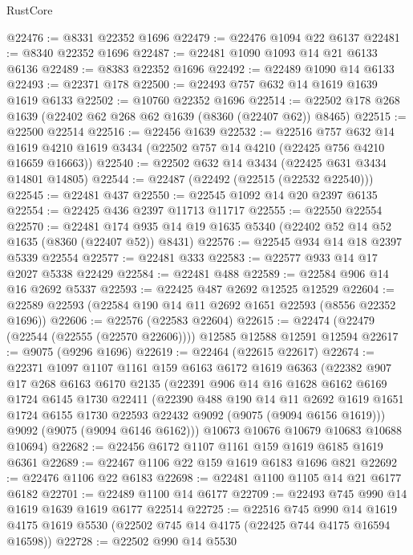 \begin{lexlean}{RustCore}
\begin{coremodule}
@22476 := @8331 @22352 @1696
@22479 := @22476 @1094 @22 @6137
@22481 := @8340 @22352 @1696
@22487 := @22481 @1090 @1093 @14 @21 @6133 @6136
@22489 := @8383 @22352 @1696
@22492 := @22489 @1090 @14 @6133
@22493 := @22371 @178
@22500 := @22493 @757 @632 @14 @1619 @1639 @1619 @6133
@22502 := @10760 @22352 @1696
@22514 := @22502 @178 @268 @1639 (@22402 @62 @268 @62 @1639 (@8360 (@22407 @62)) @8465)
@22515 := @22500 @22514
@22516 := @22456 @1639
@22532 := @22516
    @757
    @632
    @14
    @1619
    @4210
    @1619
    @3434
    (@22502 @757 @14 @4210 (@22425 @756 @4210 @16659 @16663))
@22540 := @22502 @632 @14 @3434 (@22425 @631 @3434 @14801 @14805)
@22544 := @22487 (@22492 (@22515 (@22532 @22540)))
@22545 := @22481 @437
@22550 := @22545 @1092 @14 @20 @2397 @6135
@22554 := @22425 @436 @2397 @11713 @11717
@22555 := @22550 @22554
@22570 := @22481 @174 @935 @14 @19 @1635 @5340 (@22402 @52 @14 @52 @1635 (@8360 (@22407 @52)) @8431)
@22576 := @22545 @934 @14 @18 @2397 @5339 @22554
@22577 := @22481 @333
@22583 := @22577 @933 @14 @17 @2027 @5338 @22429
@22584 := @22481 @488
@22589 := @22584 @906 @14 @16 @2692 @5337
@22593 := @22425 @487 @2692 @12525 @12529
@22604 := @22589 @22593 (@22584 @190 @14 @11 @2692 @1651 @22593 (@8556 @22352 @1696))
@22606 := @22576 (@22583 @22604)
@22615 := @22474 (@22479 (@22544 (@22555 (@22570 @22606)))) @12585 @12588 @12591 @12594
@22617 := @9075 (@9296 @1696)
@22619 := @22464 (@22615 @22617)
@22674 := @22371
    @1097
    @1107
    @1161
    @159
    @6163
    @6172
    @1619
    @6363
    (@22382
      @907
      @17
      @268
      @6163
      @6170
      @2135
      (@22391
        @906
        @14
        @16
        @1628
        @6162
        @6169
        @1724
        @6145
        @1730
        @22411
        (@22390
          @488
          @190
          @14
          @11
          @2692
          @1619
          @1651
          @1724
          @6155
          @1730
          @22593
          @22432
          @9092
          (@9075 (@9094 @6156 @1619)))
        @9092
        (@9075 (@9094 @6146 @6162)))
      @10673
      @10676
      @10679
      @10683
      @10688
      @10694)
@22682 := @22456 @6172 @1107 @1161 @159 @1619 @6185 @1619 @6361
@22689 := @22467 @1106 @22 @159 @1619 @6183 @1696 @821
@22692 := @22476 @1106 @22 @6183
@22698 := @22481 @1100 @1105 @14 @21 @6177 @6182
@22701 := @22489 @1100 @14 @6177
@22709 := @22493 @745 @990 @14 @1619 @1639 @1619 @6177 @22514
@22725 := @22516
    @745
    @990
    @14
    @1619
    @4175
    @1619
    @5530
    (@22502 @745 @14 @4175 (@22425 @744 @4175 @16594 @16598))
@22728 := @22502 @990 @14 @5530

\end{coremodule}
\end{lexlean}
